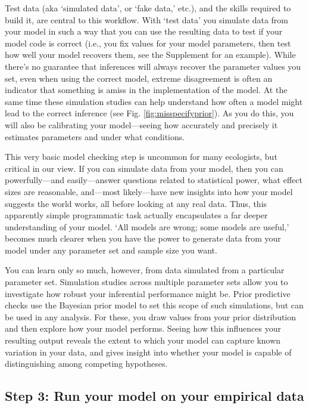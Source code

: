 \documentclass[11pt]{article}
\begin{document}
Test data (aka `simulated data', or  `fake data,' etc.), and the skills required to build it, are central to this workflow. With `test data' you simulate data from your model in such a way that you can use the resulting data to test if your model code is correct (i.e., you fix values for your model parameters, then test how well your model recovers them, see the Supplement for an example). While there's no guarantee that inferences will always recover the parameter values you set, even when using the correct model, extreme disagreement is often an indicator that something is amiss in the implementation of the model. At the same time these simulation studies can help understand how often a model might lead to the correct inference (see Fig. \ref{fig:misspecifyprior}). As you do this, you will also be calibrating your model---seeing how accurately and precisely it estimates parameters and under what conditions. 

This very basic model checking step is uncommon for many ecologists, but critical in our view. If you can simulate data from your model, then you can powerfully---and easily---answer questions related to statistical power, what effect sizes are reasonable, and---most likely---have new insights into how your model suggests the world works, all before looking at any real data. Thus, this apparently simple programmatic task actually encapsulates a far deeper understanding of your model. `All models are wrong; some models are useful,' becomes much clearer when you have the power to generate data from your model under any parameter set and sample size you want. %

You can learn only so much, however, from data simulated from a particular parameter set. Simulation studies across multiple parameter sets allow you to investigate how robust your inferential performance might be. Prior predictive checks \citep{betanprior,wesner2021,winter2023} use the Bayesian prior model to set this scope of such simulations, but can be used in any analysis. For these, you draw values from your prior distribution and then explore how your model performs. Seeing how this influences your resulting output reveals the extent to which your model can capture known variation in your data, and gives insight into whether your model is capable of distinguishing among competing hypotheses. %


 \subsection*{Step 3: Run your model on your empirical data} 
 
\end{document}
